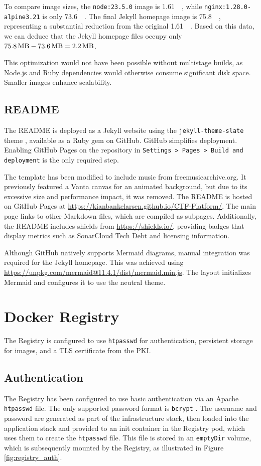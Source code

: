 To compare image sizes, the \texttt{node:23.5.0} image is \SI{1.61}{\giga\byte}, while \texttt{nginx:1.28.0\allowbreak-alpine3.21} is only \SI{73.6}{\mega\byte}. The final Jekyll homepage image is \SI{75.8}{\mega\byte}, representing a substantial reduction from the original \SI{1.61}{\gibi\byte}. Based on this data, we can deduce that the Jekyll homepage files occupy only $\SI{75.8}{\mega\byte} - \SI{73.6}{\mega\byte} = \SI{2.2}{\mega\byte}$. 

This optimization would not have been possible without multistage builds, as Node.js and Ruby dependencies would otherwise consume significant disk space. Smaller images enhance scalability.

\subsection{README}
The README is deployed as a Jekyll website using the \texttt{jekyll-theme-slate} theme \parencite{slate_theme}, available as a Ruby gem on GitHub. GitHub simplifies deployment. Enabling GitHub Pages on the repository in \texttt{Settings > Pages > Build and deployment} is the only required step.

The template has been modified to include music from freemusicarchive.org. It previously featured a Vanta canvas for an animated background, but due to its excessive size and performance impact, it was removed. The README is hosted on GitHub Pages at \url{https://kianbankelarsen.github.io/CTF-Platform/}. The main page links to other Markdown files, which are compiled as subpages. Additionally, the README includes shields from \url{https://shields.io/}, providing badges that display metrics such as SonarCloud Tech Debt and licensing information.

Although GitHub natively supports Mermaid diagrams, manual integration was required for the Jekyll homepage. This was achieved using \url{https://unpkg.com/mermaid@11.4.1/dist/mermaid.min.js}. The layout initializes Mermaid and configures it to use the neutral theme.

\section{Docker Registry}
The Registry is configured to use \texttt{htpasswd} for authentication, persistent storage for images, and a TLS certificate from the PKI.

\subsection{Authentication}
The Registry has been configured to use basic authentication via an Apache \texttt{htpasswd} file. The only supported password format is \texttt{bcrypt} \parencite{docker_distribution_config}. The username and password are generated as part of the infrastructure stack, then loaded into the application stack and provided to an init container in the Registry pod, which uses them to create the \texttt{htpasswd} file. This file is stored in an \texttt{emptyDir} volume, which is subsequently mounted by the Registry, as illustrated in Figure \ref{fig:registry_auth}.

